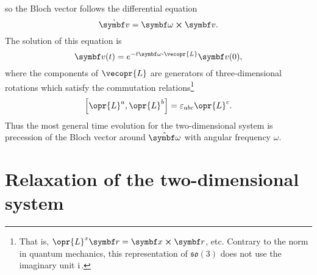 \documentclass[../thesis.tex]{subfiles}
\begin{document}
so the Bloch vector follows the differential equation
\begin{equation}
  \dot{\vq{v}}
  = \vq{\omega} \cross \vq{v}.
\end{equation}
The solution of this equation is
\begin{equation}
  \vq{v}(t)
  = e^{-t \vq{\omega} \vdot \vecopr{L}} \vq{v}(0),
\end{equation}
where the components of $\vecopr{L}$ are generators of three-dimensional
rotations which satisfy the commutation relations\footnote{%
  That is, $\opr{L}^x \vq{r} = \vq{x} \cross \vq{r}$, etc. Contrary to the norm
  in quantum mechanics, this representation of $\mathfrak{so}(3)$ does not use
  the imaginary unit $\mathrm{i}\mkern1mu$.
}
\begin{equation}
  \comm{\opr{L}^a}{\opr{L}^b}
  = \varepsilon_{abc} \opr{L}^c.
\end{equation}
Thus the most general time evolution for the two-dimensional system is
precession of the Bloch vector around $\vu{\omega}$ with angular frequency
$\omega$.


\section{Relaxation of the two-dimensional system}
\end{document}
